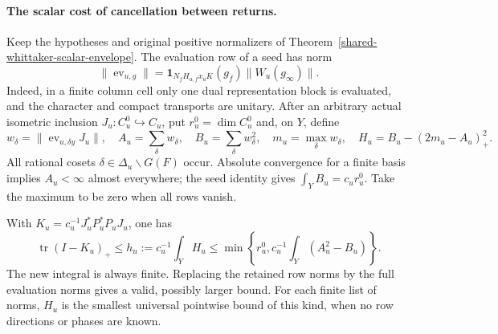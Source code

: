\paragraph{The scalar cost of cancellation between returns.}
Keep the hypotheses and original positive normalizers of
Theorem~\ref{shared-whittaker-scalar-envelope}. The evaluation row of a
seed has norm
\[
 \|\operatorname{ev}_{u,g}\|
 =\mathbf1_{N_fH_{u,f}x_uK}(g_f)\|W_u(g_\infty)\|.
\]
Indeed, in a finite column cell only one dual representation block is
evaluated, and the character and compact transports are unitary.
After an arbitrary actual isometric inclusion
\(J_u:C_u^0\hookrightarrow C_u\), put \(r_u^0=\dim C_u^0\) and,
on \(Y\), define
\[
 w_\delta=\|\operatorname{ev}_{u,\delta y}J_u\|,\quad
 A_u=\sum_\delta w_\delta,\quad B_u=\sum_\delta w_\delta^2,
 \quad m_u=\max_\delta w_\delta,
 \quad H_u=B_u-(2m_u-A_u)_+^2.
\]
All rational cosets \(\delta\in\Delta_u\backslash G(F)\) occur.
Absolute convergence for a finite basis implies \(A_u<\infty\)
almost everywhere; the seed identity gives \(\int_YB_u=c_ur_u^0\).
Take the maximum to be zero when all rows vanish.

\begin{proposition}
\label{shared-seed-return-deficit}
\label{shared-dominant-return-deficit}
With \(K_u=c_u^{-1}J_u^*P_u^*P_uJ_u\), one has
\[
 \operatorname{tr}(I-K_u)_+
 \le h_u:=c_u^{-1}\int_YH_u
 \le\min\left\{r_u^0,
              c_u^{-1}\int_Y(A_u^2-B_u)\right\}.
\]
The new integral is always finite. Replacing the retained row norms by
the full evaluation norms gives a valid, possibly larger bound.
For each finite list of norms, \(H_u\) is the smallest universal
pointwise bound of this kind, when no row directions or phases are known.
\end{proposition}


